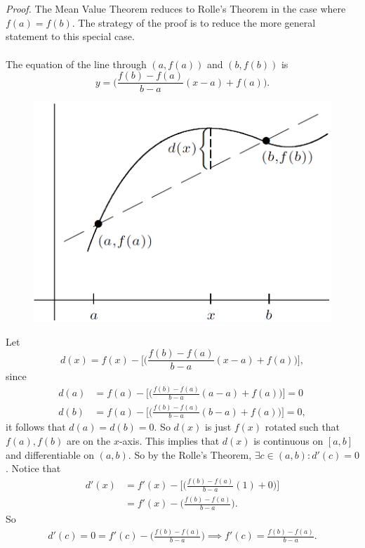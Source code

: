 \documentclass{article}
\begin{document}
            \\ \\
        \textit{Proof.} The Mean Value Theorem reduces to Rolle's Theorem in the case where $f(a)=f(b)$. The strategy of the proof is to reduce the more general statement to this special case.
        \\ \\
        The equation of the line through $(a,f(a))$ and $(b,f(b))$ is
        \begin{equation*}
            y = \bigg(\frac{f(b)-f(a)}{b-a}(x-a)+f(a)\bigg).
        \end{equation*}
        \begin{figure}[ht!]
            \centering
            \includegraphics[width=0.5\linewidth]{figs/d(x).png}
        \end{figure}
        Let 
        \begin{equation*}
            d(x) = f(x) - \bigg[\bigg(\frac{f(b)-f(a)}{b-a}(x-a)+f(a)\bigg)\bigg],
        \end{equation*}
        since
        \begin{align*}
            d(a) &= f(a) - \bigg[\bigg(\frac{f(b)-f(a)}{b-a}(a-a)+f(a)\bigg)\bigg] = 0 \\
            d(b) &= f(a) - \bigg[\bigg(\frac{f(b)-f(a)}{b-a}(b-a)+f(a)\bigg)\bigg] = 0,
        \end{align*}
        it follows that $d(a) = d(b) = 0$. So $d(x)$ is just $f(x)$ rotated such that $f(a),f(b)$ are on the $x$-axis. This implies that $d(x)$ is continuous on $[a,b]$ and differentiable on $(a,b)$. So by the Rolle's Theorem, $\exists c \in (a,b): d'(c)=0$. Notice that
        \begin{align*}
            d'(x) &= f'(x) - \bigg[\bigg(\frac{f(b)-f(a)}{b-a}(1)+0\bigg)\bigg] \\
            &= f'(x) - \bigg(\frac{f(b)-f(a)}{b-a}\bigg).
        \end{align*}
        So
        \begin{align*}
            d'(c) = 0 = f'(c) - \bigg(\frac{f(b)-f(a)}{b-a}\bigg) \implies 
            f'(c) = \frac{f(b)-f(a)}{b-a}.
        \end{align*}
\end{document}

